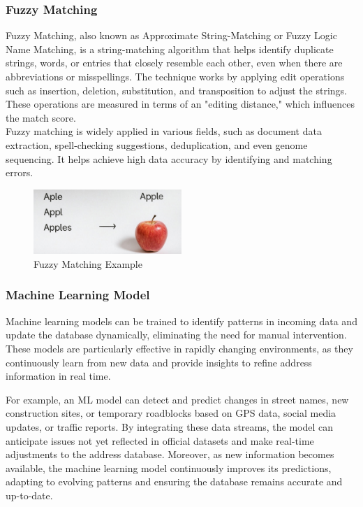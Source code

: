         \subsubsection{Fuzzy Matching}
        Fuzzy Matching, also known as Approximate String-Matching or Fuzzy Logic Name Matching, is a string-matching algorithm that helps identify duplicate strings, words, or entries that closely resemble each other, even when there are abbreviations or misspellings. The technique works by applying edit operations such as insertion, deletion, substitution, and transposition to adjust the strings. These operations are measured in terms of an "editing distance," which influences the match score.\\
        
        Fuzzy matching is widely applied in various fields, such as document data extraction, spell-checking suggestions, deduplication, and even genome sequencing. It helps achieve high data accuracy by identifying and matching errors. \autocite{Nieters2024Dec}

        \begin{figure}[H]
            \centering
            \includegraphics[width=0.5\textwidth]{images/AdminPanel/FuzzyMatching.png}
            \caption{Fuzzy Matching Example}
            \label{fig:fuzzy-matching}
        \end{figure}

        \subsubsection{Machine Learning Model}
        Machine learning models can be trained to identify patterns in incoming data and update the database dynamically, eliminating the need for manual intervention. These models are particularly effective in rapidly changing environments, as they continuously learn from new data and provide insights to refine address information in real time.

        For example, an ML model can detect and predict changes in street names, new construction sites, or temporary roadblocks based on GPS data, social media updates, or traffic reports. By integrating these data streams, the model can anticipate issues not yet reflected in official datasets and make real-time adjustments to the address database. Moreover, as new information becomes available, the machine learning model continuously improves its predictions, adapting to evolving patterns and ensuring the database remains accurate and up-to-date. \autocite{Encora2023Nov}
        
